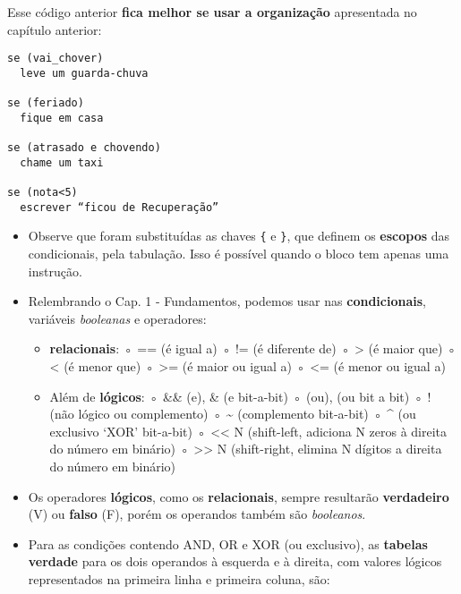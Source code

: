 \documentclass[12pt,a4paper]{article}
\providecommand{\tightlist}{%
      \setlength{\itemsep}{0pt}\setlength{\parskip}{0pt}}
\begin{document}
    Esse código anterior \textbf{fica melhor se usar a organização}
apresentada no capítulo anterior:

    \begin{verbatim}
se (vai_chover) 
  leve um guarda-chuva 

se (feriado) 
  fique em casa 

se (atrasado e chovendo)  
  chame um taxi 

se (nota<5) 
  escrever “ficou de Recuperação” 
\end{verbatim}

    \begin{itemize}
\item
  Observe que foram substituídas as chaves \texttt{\{} e \texttt{\}},
  que definem os \textbf{escopos} das condicionais, pela tabulação. Isso
  é possível quando o bloco tem apenas uma instrução.
\item
  Relembrando o Cap. 1 - Fundamentos, podemos usar nas
  \textbf{condicionais}, variáveis \emph{booleanas} e operadores:

  \begin{itemize}
  \tightlist
  \item
    \textbf{relacionais}: ◦ == (é igual a) ◦ != (é diferente de) ◦
    \textgreater{} (é maior que) ◦ \textless{} (é menor que) ◦
    \textgreater= (é maior ou igual a) ◦ \textless= (é menor ou igual a)
  \item
    Além de \textbf{lógicos}: ◦ \&\& (e), \& (e bit-a-bit) ◦
    \textbar\textbar{} (ou), \textbar{} (ou bit a bit) ◦ ! (não lógico
    ou complemento) ◦ \textasciitilde{} (complemento bit-a-bit) ◦ \^{}
    (ou exclusivo `XOR' bit-a-bit) ◦ \textless\textless{} N (shift-left,
    adiciona N zeros à direita do número em binário) ◦
    \textgreater\textgreater{} N (shift-right, elimina N dígitos a
    direita do número em binário)
  \end{itemize}
\end{itemize}

    \begin{itemize}
\item
  Os operadores \textbf{lógicos}, como os \textbf{relacionais}, sempre
  resultarão \textbf{verdadeiro} (V) ou \textbf{falso} (F), porém os
  operandos também são \emph{booleanos}.
\item
  Para as condições contendo AND, OR e XOR (ou exclusivo), as
  \textbf{tabelas verdade} para os dois operandos à esquerda e à
  direita, com valores lógicos representados na primeira linha e
  primeira coluna, são:
\end{itemize}
\end{document}
